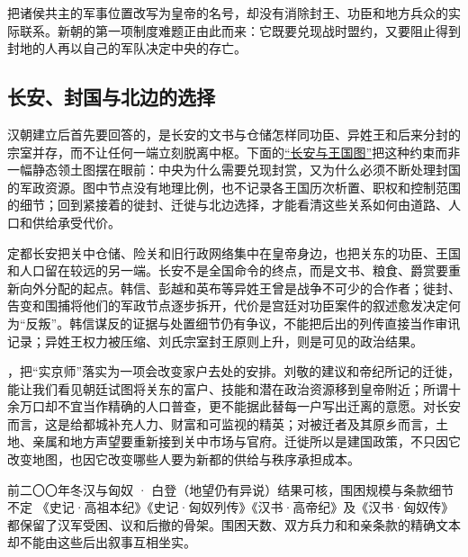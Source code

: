 \begin{turningpoint}[皇帝名号不能替代战争同盟]
把诸侯共主的军事位置改写为皇帝的名号，却没有消除封王、功臣和地方兵众的实际联系。新朝的第一项制度难题正由此而来：它既要兑现战时盟约，又要阻止得到封地的人再以自己的军队决定中央的存亡。
\end{turningpoint}

\subsection{长安、封国与北边的选择}

汉朝建立后首先要回答的，是长安的文书与仓储怎样同功臣、异姓王和后来分封的宗室并存，而不让任何一端立刻脱离中枢。下面的\hyperref[fig:changan-feudal-constraints]{“长安与王国图”}把这种约束而非一幅静态领土图摆在眼前：中央为什么需要兑现封赏，又为什么必须不断处理封国的军政资源。图中节点没有地理比例，也不记录各王国历次析置、职权和控制范围的细节；回到紧接着的徙封、迁徙与北边选择，才能看清这些关系如何由道路、人口和供给承受代价。


定都长安把关中仓储、险关和旧行政网络集中在皇帝身边，也把关东的功臣、王国和人口留在较远的另一端。长安不是全国命令的终点，而是文书、粮食、爵赏要重新向外分配的起点。韩信、彭越和英布等异姓王曾是战争不可少的合作者；徙封、告变和围捕将他们的军政节点逐步拆开，代价是宫廷对功臣案件的叙述愈发决定何为“反叛”。韩信谋反的证据与处置细节仍有争议，不能把后出的列传直接当作审讯记录；异姓王权力被压缩、刘氏宗室封王原则上升，则是可见的政治结果。

，把“实京师”落实为一项会改变家户去处的安排。刘敬的建议和帝纪所记的迁徙，能让我们看见朝廷试图将关东的富户、技能和潜在政治资源移到皇帝附近；所谓十余万口却不宜当作精确的人口普查，更不能据此替每一户写出迁离的意愿。对长安而言，这是给都城补充人力、财富和可监视的精英；对被迁者及其原乡而言，土地、亲属和地方声望要重新接到关中市场与官府。迁徙所以是建国政策，不只因它改变地图，也因它改变哪些人要为新都的供给与秩序承担成本。

\begin{event}{}{前二〇〇年冬}{汉与匈奴 · 白登（地望仍有异说）}{结果可核，围困规模与条款细节不定}
《史记·高祖本纪》《史记·匈奴列传》《汉书·高帝纪》及《汉书·匈奴传》都保留了汉军受困、议和后撤的骨架。围困天数、双方兵力和和亲条款的精确文本却不能由这些后出叙事互相坐实。
\end{event}

